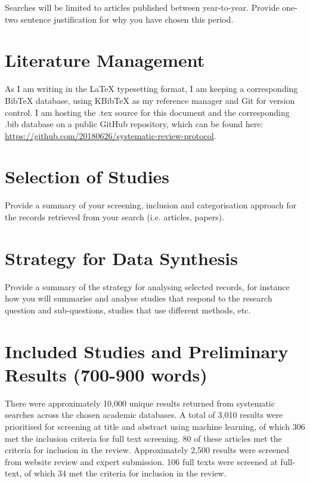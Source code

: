 \documentclass[a4paper,12pt]{article}
\begin{document}
\par Searches will be limited to articles published between 
year-to-year. Provide one-two sentence justification for why you have 
chosen this period. 

\section*{Literature Management}

\par As I am writing in the LaTeX typesetting format, I am keeping a 
corresponding BibTeX database, using KBibTeX as my reference 
manager and Git for version control. I am hosting the .tex source for 
this document and the corresponding .bib database on a public GitHub 
repository, which can be found here: 
\url{https://github.com/20180626/systematic-review-protocol}.

\section*{Selection of Studies}

\par Provide a summary of your screening, inclusion and categorisation 
approach for the records retrieved from your search (i.e. articles, 
papers).

\section*{Strategy for Data Synthesis}

\par Provide a summary of the strategy for analysing selected records, 
for instance how you will summarise and analyse studies that respond 
to the research question and sub-questions, studies that use different 
methods, etc. 

\section*{Included Studies and Preliminary Results (700-900 words)}

\par There were approximately 10,000 unique results returned from 
systematic searches across the chosen academic databases. A total of 
3,010 results were prioritised for screening at title and abstract 
using machine learning, of which 306 met the inclusion criteria for 
full text screening. 80 of these articles met the criteria for 
inclusion in the review. Approximately 2,500 results were screened 
from website review and expert submission. 106 full texts were 
screened at full-text, of which 34 met the criteria for inclusion in 
the review. \\
\end{document}
